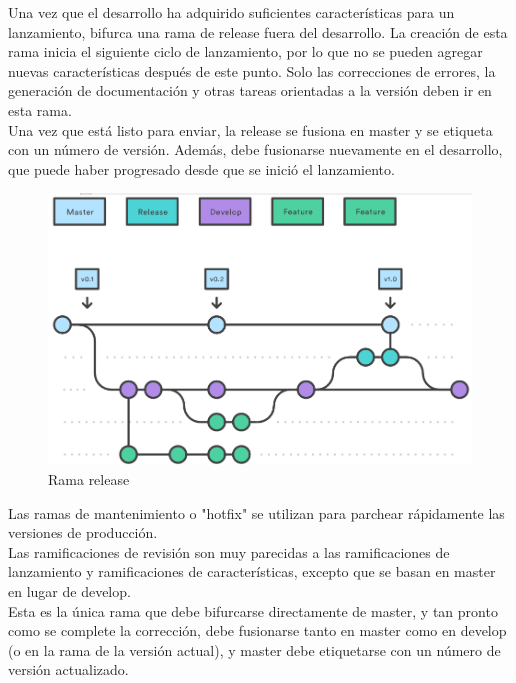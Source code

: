 
\quad Una vez que el desarrollo ha adquirido suficientes características para un lanzamiento,  bifurca una rama de release fuera del desarrollo. La creación de esta rama inicia el siguiente ciclo de lanzamiento, por lo que no se pueden agregar nuevas características después de este punto. Solo las correcciones de errores, la generación de documentación y otras tareas orientadas a la versión deben ir en esta rama.\\ 

\quad Una vez que está listo para enviar, la release se fusiona en master y se etiqueta con un número de versión. Además, debe fusionarse nuevamente en el desarrollo, que puede haber progresado desde que se inició el lanzamiento.\\

\begin{figure}[htb]
	\centering
	\includegraphics[width=1\textwidth]{./imagenes/release}
	\caption{Rama release}
\end{figure}


\quad Las ramas de mantenimiento o "hotfix" se utilizan para parchear rápidamente las versiones de producción.\\

\quad Las ramificaciones de revisión son muy parecidas a las ramificaciones de lanzamiento y ramificaciones de características, excepto que se basan en master en lugar de develop.\\

\quad Esta es la única rama que debe bifurcarse directamente de master, y tan pronto como se complete la corrección, debe fusionarse tanto en master como en develop (o en la rama de la versión actual), y master debe etiquetarse con un número de versión actualizado.\\

